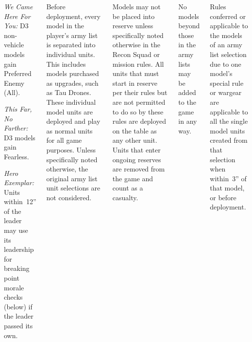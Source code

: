 \begin{columns}
\begin{squishitemize}


\item \emph{We Came Here For You:} D3 non-vehicle models gain
  Preferred Enemy (All).

\item \emph{This Far, No Farther:} D3 models gain Fearless.

\item \emph{Hero Exemplar:} Units within~12'' of the leader may use
  its leadership for breaking point morale checks (below) if the
  leader passed its own.
\end{squishitemize}


\pagebreak
{}%

\vspace{-9pt}%
  Before deployment, every model in
the player's army list is separated into individual units. This
includes models purchased as upgrades, such as Tau Drones. These
individual model units are deployed and play as normal units for all
game purposes. Unless specifically noted otherwise, the original army
list unit selections are not considered.

  Models may not be placed
into reserve unless specifically noted otherwise in the Recon Squad or
mission rules. All units that must start in reserve per their rules
but are not permitted to do so by these rules are deployed on the
table as any other unit. Units that enter ongoing reserves are removed
from the game and count as a casualty.

  No models beyond those in
the army lists may be added to the game in any way.

  Rules conferred or applicable
to the models of an army list selection due to one model's special
rule or wargear are applicable to all the single model units created
from that selection when within~3'' of that model, or before
deployment.



\end{columns}
